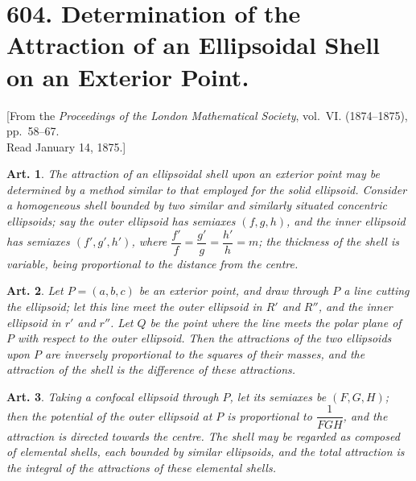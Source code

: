 \documentclass[12pt,a4paper]{article}
\theoremstyle{cayley}
\newtheorem{art}{Art.}[section]
\begin{document}
\newpage
\section[Determination of the Attraction of an Ellipsoidal Shell on an Exterior Point]%
{604. Determination of the Attraction of an Ellipsoidal Shell on an Exterior Point.}

\begin{center}
{\small [From the \textit{Proceedings of the London Mathematical Society}, vol.~VI. (1874--1875), pp.~58--67.\\
Read January 14, 1875.]}
\end{center}

\begin{art}
The attraction of an ellipsoidal shell upon an exterior point may be determined by a method similar to that employed for the solid ellipsoid. Consider a homogeneous shell bounded by two similar and similarly situated concentric ellipsoids; say the outer ellipsoid has semiaxes $(f, g, h)$, and the inner ellipsoid has semiaxes $(f', g', h')$, where $\dfrac{f'}{f} = \dfrac{g'}{g} = \dfrac{h'}{h} = m$; the thickness of the shell is variable, being proportional to the distance from the centre.
\end{art}

\begin{art}
Let $P = (a, b, c)$ be an exterior point, and draw through $P$ a line cutting the ellipsoid; let this line meet the outer ellipsoid in $R'$ and $R''$, and the inner ellipsoid in $r'$ and $r''$. Let $Q$ be the point where the line meets the polar plane of $P$ with respect to the outer ellipsoid. Then the attractions of the two ellipsoids upon $P$ are inversely proportional to the squares of their masses, and the attraction of the shell is the difference of these attractions.
\end{art}

\begin{art}
Taking a confocal ellipsoid through $P$, let its semiaxes be $(F, G, H)$; then the potential of the outer ellipsoid at $P$ is proportional to $\dfrac{1}{F G H}$, and the attraction is directed towards the centre. The shell may be regarded as composed of elemental shells, each bounded by similar ellipsoids, and the total attraction is the integral of the attractions of these elemental shells.
\end{art}
\end{document}
